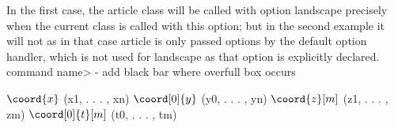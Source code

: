 In the first case, the article class will be called with option landscape precisely when the current class is called with this option; but in the second example it will not as in that case article is only passed options by the default option handler, which is not used for landscape as that option is explicitly declared.
\@onlypreamble\<command name>
\overfullrule=2cm
-   add black bar where overfull box occurs

$\coord{x}$ (x1, . . . , xn)
$\coord[0]{y}$ (y0, . . . , yn)
$\coord{z}[m]$ (z1, . . . , zm)
$\coord[0]{t}[m]$ (t0, . . . , tm)

